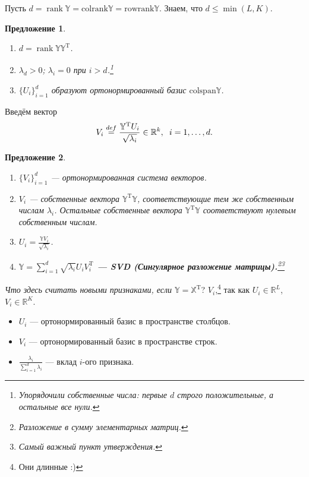 \documentclass[specialist, 12pt,
subf, %
href, colorlinks=true,
substylefile = spbu.rtx,
]{disser}
\newtheorem{proposition}{Предложение}
\DeclareMathOperator{\rnk}{rank}
\begin{document}
Пусть $d = \rnk \mathbb{Y} = \mathrm{colrank} \mathbb{Y} = \mathrm{rowrank}\mathbb{Y}$. Знаем, что $d \leq \min (L,K)$.
\begin{proposition}
\begin{enumerate}
	\item $d = \rnk \mathbb{Y} \mathbb{Y}^{\mathrm{T}}$.
	\item $\lambda_d > 0$; $\lambda_i = 0$ при $i > d$.\footnote{Упорядочили собственные числа: первые $d$ строго положительные, а остальные все нули.}
	\item $\{U_i\}_{i = 1}^d$ образуют ортонормированный базис $\mathrm{colspan} \mathbb{Y}$.
\end{enumerate}	
\end{proposition}

Введём вектор
\begin{gather*}
V_i \stackrel{def}{=} \frac{\mathbb{Y}^{\mathrm{T}}U_i}{\sqrt{\lambda_i}} \in \mathbb{R}^k, \hspace{0.2 cm} i = 1, \ldots, d.
\end{gather*}
\begin{proposition}
	\begin{enumerate}
		\item $\{V_i\}_{i = 1}^d$ --- ортонормированная система векторов.
		\item $V_i$ --- собственные вектора $ \mathbb{Y}^{\mathrm{T}}\mathbb{Y}$, соответствующие тем же собственным числам $\lambda_i$. Остальные собственные вектора $ \mathbb{Y}^{\mathrm{T}}\mathbb{Y}$ соответствуют нулевым собственным числам.
		\item $U_i = \displaystyle{\frac{\mathbb{Y}V_i}{\sqrt{\lambda_i}}}$.
		\item \textbf{$\mathbb{Y} = \sum\limits_{i = 1}^d \sqrt{\lambda_i} U_i V_i^{\mathrm{T}}$ --- SVD (Сингулярное разложение матрицы).}\footnote{Разложение в сумму элементарных матриц.}\footnote{Самый важный пункт утверждения.}
	\end{enumerate}
\end{proposition}
\textit{Что здесь считать новыми признаками, если $\mathbb{Y} = \mathbb{X}^{\mathrm{T}}$}? $V_i$,\footnote{Они длинные :)} так как $U_i \in \mathbb{R}^L$, $V_i \in \mathbb{R}^K$.
\begin{itemize}
	\item $U_i$ --- ортонормированный базис в пространстве столбцов.
	\item $V_i$ --- ортонормированный базис в пространстве строк.
	\item $\displaystyle\frac{\lambda_i}{\sum_{i=1}^d \lambda_i}$ --- вклад $i$-ого признака.
\end{itemize}
 
\end{document}
